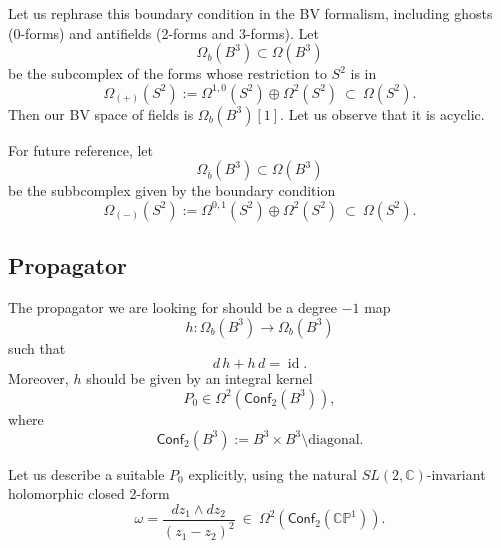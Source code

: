 \documentclass[a4paper]{amsart}
\theoremstyle{plain}
\theoremstyle{definition}
\newcommand{\on}{\operatorname}
\newcommand{\C}{\mathbb{C}}
\newcommand{\CP}{\mathbb{CP}^1}
\newcommand{\id}{\on{id}}
\newcommand{\cf}{\mathsf{Conf}}
\begin{document}
Let us rephrase this boundary condition in the BV formalism, including ghosts (0-forms) and antifields (2-forms and 3-forms). Let 
$$\Omega_b(B^3)\subset\Omega(B^3)$$
be the subcomplex of the forms whose restriction to $S^2$ is in
$$\Omega_{(+)}(S^2):=\Omega^{1,0}(S^2)\oplus\Omega^2(S^2)\ \subset\ \Omega(S^2).$$
Then our BV space of fields is
$\Omega_b(B^3)[1]$.
Let us observe that it is acyclic.


For future reference, let 
$$\Omega_{\bar b}(B^3)\subset\Omega(B^3)$$
be the subbcomplex given by the boundary condition
$$\Omega_{(-)}(S^2):=\Omega^{0,1}(S^2)\oplus\Omega^2(S^2)\ \subset\ \Omega(S^2).$$


\subsection{Propagator}\label{ssec:Propagator}
The propagator we are looking for should be a degree $-1$ map 
$$h\colon\Omega_b(B^3)\to\Omega_b(B^3)$$
such that
$$d\,h+h\,d=\id.$$
Moreover, $h$ should be given by an integral kernel 
$$P_0\in\Omega^2(\cf_2(B^3)),$$
where
$$\cf_2(B^3):=B^3\times B^3\setminus\text{diagonal}.$$

Let us describe a suitable $P_0$ explicitly, using the natural $SL(2,\C)$-invariant holomorphic closed 2-form
\begin{equation}\label{omega}
\omega =\frac{dz_1\wedge dz_2}{(z_1-z_2)^2}\ \in\ \Omega^2(\cf_2(\CP)). 
\end{equation}
\end{document}
